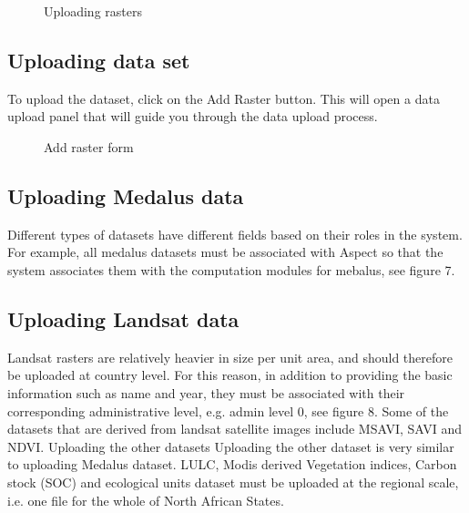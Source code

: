 \documentclass[letterpaper,10pt,english]{sphinxmanual}
\let\sphinxpxdimen\pdfpxdimen\else\newdimen\sphinxpxdimen
\begin{document}
\begin{figure}[H]
\centering
\capstart

\noindent\sphinxincludegraphics[width=718\sphinxpxdimen,height=599\sphinxpxdimen]{{admin8}.png}
\caption{Uploading rasters}\label{\detokenize{Introduction/admin:id8}}\end{figure}


\subsection{Uploading data set}
\label{\detokenize{Introduction/admin:uploading-data-set}}
\sphinxAtStartPar
To upload the dataset, click on the Add Raster button. This will open a data upload panel that will guide you through the data upload process.

\begin{figure}[H]
\centering
\capstart

\noindent\sphinxincludegraphics[width=813\sphinxpxdimen,height=591\sphinxpxdimen]{{admin9}.png}
\caption{Add raster form}\label{\detokenize{Introduction/admin:id9}}\end{figure}


\subsection{Uploading Medalus data}
\label{\detokenize{Introduction/admin:uploading-medalus-data}}
\sphinxAtStartPar
Different types of datasets have different fields based on their roles in the system. For example, all medalus datasets must be associated with Aspect so that the system associates them with the computation modules for mebalus, see figure 7.


\subsection{Uploading Landsat data}
\label{\detokenize{Introduction/admin:uploading-landsat-data}}
\sphinxAtStartPar
Landsat rasters are relatively heavier in size per unit area, and should therefore be uploaded at country level. For this reason, in addition to providing the basic information such as name and year, they must be associated with their corresponding administrative level, e.g. admin level 0, see figure 8. Some of the datasets that are derived from landsat satellite images include MSAVI, SAVI and NDVI.
Uploading the other datasets
Uploading the other dataset is very similar to uploading Medalus dataset. LULC, Modis derived Vegetation indices, Carbon stock (SOC) and ecological units dataset must be uploaded at the regional scale, i.e. one file for the whole of North African States.
\end{document}
